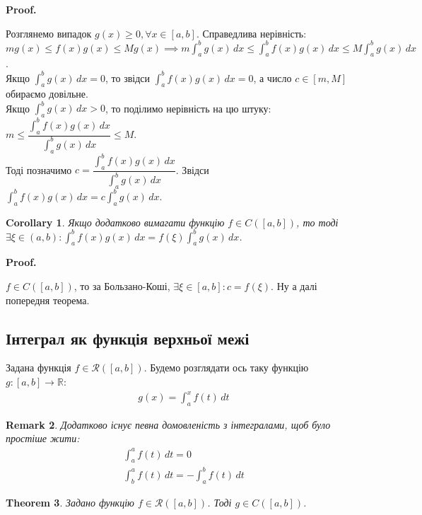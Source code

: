 \documentclass[a4paper, 10pt]{article}
\makeatletter
\def\huge{\displaystyle}
\theoremstyle{theoremdd}
\newtheorem{theorem}{Theorem}[subsection]
\theoremstyle{theoremdd}
\theoremstyle{theoremdd}
\theoremstyle{theoremdd}
\theoremstyle{theoremdd}
\theoremstyle{theoremdd}
\theoremstyle{theoremdd}
\newtheorem{remark}[theorem]{Remark}
\theoremstyle{theoremdd}
\theoremstyle{theoremdd}
\newtheorem{corollary}[theorem]{Corollary}
\renewenvironment{proof}[1][Proof.\\]{\par
\pushQED{\hfill \qed}%
\normalfont \topsep6\p@\@plus6\p@\relax
\trivlist
\item\relax
{\bfseries
#1\@addpunct{.}}\hspace\labelsep\ignorespaces
}{%
\popQED\endtrivlist\@endpefalse
}
\makeatother
\begin{document}
\begin{proof}
Розглянемо випадок $g(x) \geq 0, \forall x \in [a,b]$. Справедлива нерівність:\\
$mg(x) \leq f(x)g(x) \leq M g(x) \implies \huge m\int_a^b g(x)\,dx \leq \int_a^b f(x)g(x)\,dx \leq M \int_a^b g(x)\,dx$.\\
Якщо $\huge\int_a^b g(x)\,dx = 0$, то звідси $\huge\int_a^b f(x)g(x)\,dx = 0$, а число $c \in [m,M]$ обираємо довільне.
\bigskip \\
Якщо $\huge\int_a^b g(x)\,dx > 0$, то поділимо нерівність на цю штуку:\\
$m \leq \dfrac{\huge\int_a^b f(x)g(x)\,dx}{\huge\int_a^b g(x)\,dx} \leq M$. \\
Тоді позначимо $c = \dfrac{\huge\int_a^b f(x)g(x)\,dx}{\huge\int_a^b g(x)\,dx}$. Звідси $\huge\int_a^b f(x)g(x)\,dx = c \int_a^b g(x)\,dx$.
\end{proof}

\begin{corollary}
Якщо додатково вимагати функцію $f \in C([a,b])$, то тоді \\ $\exists \xi \in (a,b): \huge\int_a^b f(x)g(x)\,dx = f(\xi) \int_a^b g(x)\,dx$.
\end{corollary}

\begin{proof}
$f \in C([a,b])$, то за Бользано-Коші, $\exists \xi \in [a,b]: c = f(\xi)$. Ну а далі попередня теорема.
\end{proof}

\subsection{Інтеграл як функція верхньої межі}
Задана функція $f \in \mathcal{R}([a,b])$. Будемо розглядати ось таку функцію $g \colon [a,b] \to \mathbb{R}$:
\begin{align*}
g(x) = \int_a^x f(t)\,dt
\end{align*}

\begin{remark}
Додатково існує певна домовленість з інтегралами, щоб було простіше жити:
\begin{align*}
\int_a^a f(t)\,dt = 0 \\
\int_b^a f(t)\,dt = -\int_a^b f(t)\,dt
\end{align*}
\end{remark}

\begin{theorem}
Задано функцію $f \in \mathcal{R}([a,b])$. Тоді $g \in C([a,b])$.
\end{theorem}
\end{document}
